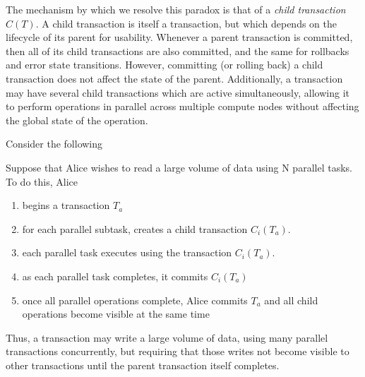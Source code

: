 The mechanism by which we resolve this paradox is that of a \emph{child transaction} $C(T)$. A child transaction is itself a transaction, but which depends on the lifecycle of its parent for usability. Whenever a parent transaction is committed, then all of its child transactions are also committed, and the same for rollbacks and error state transitions. However, committing (or rolling back) a child transaction does not affect the state of the parent. Additionally, a transaction may have several child transactions which are active simultaneously, allowing it to perform operations in parallel across multiple compute nodes without affecting the global state of the operation.

Consider the following
\begin{exmp}
	Suppose that Alice wishes to read a large volume of data using N parallel tasks. To do this, Alice

	\begin{enumerate}
		\item begins a transaction $T_a$
		\item for each parallel subtask, creates a child transaction $C_i(T_a)$.
		\item each parallel task executes using the transaction $C_i(T_a)$.
		\item as each parallel task completes, it commits $C_i(T_a)$
		\item once all parallel operations complete, Alice commits $T_a$ and all child operations become visible at the same time
	\end{enumerate}
\end{exmp}

Thus, a transaction may write a large volume of data, using many parallel transactions concurrently, but requiring that those writes not become visible to other transactions until the parent transaction itself completes.

